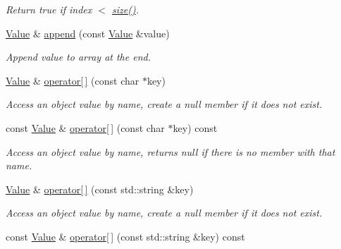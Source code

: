 \begin{DoxyCompactItemize}
\begin{DoxyCompactList}\small\item\em Return true if index $<$ \hyperlink{class_json_1_1_value_a084e52ae96038a05bcae177b345adc78}{size()}. \end{DoxyCompactList}\item 
\hyperlink{class_json_1_1_value}{Value} \& \hyperlink{class_json_1_1_value_a2f95f349fc5158284fd8b84642670829}{append} (const \hyperlink{class_json_1_1_value}{Value} \&value)
\begin{DoxyCompactList}\small\item\em Append value to array at the end. \end{DoxyCompactList}\item 
\hypertarget{class_json_1_1_value_a4c5a6a0679f619ca934f8e2bf381879d}{\hyperlink{class_json_1_1_value}{Value} \& \hyperlink{class_json_1_1_value_a4c5a6a0679f619ca934f8e2bf381879d}{operator\mbox{[}$\,$\mbox{]}} (const char $\ast$key)}\label{class_json_1_1_value_a4c5a6a0679f619ca934f8e2bf381879d}

\begin{DoxyCompactList}\small\item\em Access an object value by name, create a null member if it does not exist. \end{DoxyCompactList}\item 
\hypertarget{class_json_1_1_value_a5e8d21bde510ef17ed86d8d7cc3da02c}{const \hyperlink{class_json_1_1_value}{Value} \& \hyperlink{class_json_1_1_value_a5e8d21bde510ef17ed86d8d7cc3da02c}{operator\mbox{[}$\,$\mbox{]}} (const char $\ast$key) const }\label{class_json_1_1_value_a5e8d21bde510ef17ed86d8d7cc3da02c}

\begin{DoxyCompactList}\small\item\em Access an object value by name, returns null if there is no member with that name. \end{DoxyCompactList}\item 
\hypertarget{class_json_1_1_value_a7c5387dea09fecbfc90b89485562186c}{\hyperlink{class_json_1_1_value}{Value} \& \hyperlink{class_json_1_1_value_a7c5387dea09fecbfc90b89485562186c}{operator\mbox{[}$\,$\mbox{]}} (const std\+::string \&key)}\label{class_json_1_1_value_a7c5387dea09fecbfc90b89485562186c}

\begin{DoxyCompactList}\small\item\em Access an object value by name, create a null member if it does not exist. \end{DoxyCompactList}\item 
\hypertarget{class_json_1_1_value_a5d70c35a3bfad3c8008bbe53cc038715}{const \hyperlink{class_json_1_1_value}{Value} \& \hyperlink{class_json_1_1_value_a5d70c35a3bfad3c8008bbe53cc038715}{operator\mbox{[}$\,$\mbox{]}} (const std\+::string \&key) const }\label{class_json_1_1_value_a5d70c35a3bfad3c8008bbe53cc038715}


\end{DoxyCompactItemize}
